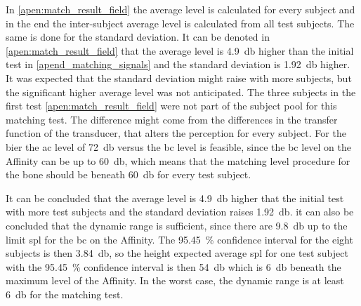 In \autoref{apen:match_result_field} the average level is calculated for every subject and in the end the inter-subject average level is calculated from all test subjects. The same is done for the standard deviation. It can be denoted in \autoref{apen:match_result_field} that the average level is \SI{4.9}{\decibel} higher than the initial test in \autoref{apend_matching_signals} and the standard deviation is \SI{1.92}{\decibel} higher. It was expected that the standard deviation might raise with more subjects, but the significant higher average level was not anticipated. The three subjects in the first test     \autoref{apen:match_result_field} were not part of the subject pool for this matching test. The difference might come from the differences in the transfer function of the transducer, that alters the perception for every subject. For the \gls{bier} the \gls{ac} level of \SI{72}{\decibel} versus the  \gls{bc} level is feasible, since the \gls{bc} level on the Affinity can be up to \SI{60}{\decibel}, which means that the matching level procedure for the bone should be beneath \SI{60}{\decibel} for every test subject.

It can be concluded that the average level is  \SI{4.9}{\decibel} higher that the initial test with more test subjects and the standard deviation raises \SI{1.92}{\decibel}. it can also be concluded that the dynamic range is sufficient, since there are \SI{9.8}{\decibel} up to the limit \gls{spl} for the \gls{bc} on the Affinity. The \SI{95.45}{\percent} confidence interval for the eight subjects is then  \SI{3.84}{\decibel}, so the height expected average \gls{spl} for one test subject with the \SI{95.45}{\percent} confidence interval is then \SI{54}{\decibel} which is \SI{6}{\decibel} beneath the maximum level of the Affinity. In the worst case, the dynamic range is at least  \SI{6}{\decibel} for the matching test.
